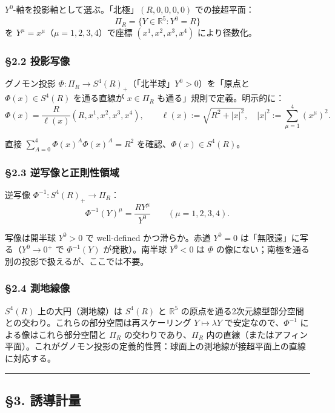 \documentclass[a4paper,11pt]{ltjsarticle}
\theoremstyle{definition}
\begin{document}
\(Y^0\)-軸を投影軸として選ぶ。「北極」\((R, 0, 0, 0, 0)\) での接超平面：
\[\Pi_R = \{Y \in \mathbb{R}^5 : Y^0 = R\}\] を
\(Y^\mu = x^\mu\)（\(\mu = 1, 2, 3, 4\)）で座標 \((x^1, x^2, x^3, x^4)\)
により径数化。

\subsubsection{§2.2 投影写像}\label{ux6295ux5f71ux5199ux50cf}

グノモン投影
\(\Phi : \Pi_R \to S^4(R)_+\)（「北半球」\(Y^0 > 0\)）を「原点と
\(\Phi(x) \in S^4(R)\) を通る直線が \(x \in \Pi_R\)
も通る」規則で定義。明示的に：
\[\Phi(x) = \frac{R}{\ell(x)} (R, x^1, x^2, x^3, x^4), \qquad \ell(x) := \sqrt{R^2 + |x|^2}, \quad |x|^2 := \sum_{\mu=1}^{4} (x^\mu)^2.\]

直接 \(\sum_{A=0}^{4} \Phi(x)^A \Phi(x)^A = R^2\)
を確認、\(\Phi(x) \in S^4(R)\)。

\subsubsection{§2.3
逆写像と正則性領域}\label{ux9006ux5199ux50cfux3068ux6b63ux5247ux6027ux9818ux57df}

逆写像 \(\Phi^{-1} : S^4(R)_+ \to \Pi_R\)：
\[\Phi^{-1}(Y)^\mu = \frac{R Y^\mu}{Y^0} \qquad (\mu = 1, 2, 3, 4).\]

写像は開半球 \(Y^0 > 0\) で well-defined かつ滑らか。赤道 \(Y^0 = 0\)
は「無限遠」に写る（\(Y^0 \to 0^+\) で \(\Phi^{-1}(Y)\) が発散）。南半球
\(Y^0 < 0\) は \(\Phi\)
の像にない；南極を通る別の投影で扱えるが、ここでは不要。

\subsubsection{§2.4 測地線像}\label{ux6e2cux5730ux7ddaux50cf}

\(S^4(R)\) 上の大円（測地線）は \(S^4(R)\) と \(\mathbb{R}^5\)
の原点を通る2次元線型部分空間との交わり。これらの部分空間は再スケーリング
\(Y \mapsto \lambda Y\) で安定なので、\(\Phi^{-1}\)
による像はこれら部分空間と \(\Pi_R\) の交わりであり、\(\Pi_R\)
内の直線（またはアフィン平面）。これがグノモン投影の定義的性質：球面上の測地線が接超平面上の直線に対応する。

\begin{center}\rule{0.5\linewidth}{0.5pt}\end{center}

\subsection{§3. 誘導計量}\label{ux8a98ux5c0eux8a08ux91cf}
\end{document}
